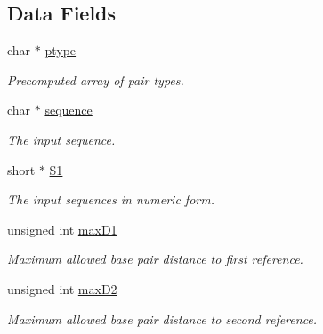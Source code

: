 \subsection*{Data Fields}
\begin{DoxyCompactItemize}
\item 
\mbox{\label{structTwoDpfold__vars_a67f37b8901b8d0a049c216d4c6241b07}} 
char $\ast$ \mbox{\hyperlink{structTwoDpfold__vars_a67f37b8901b8d0a049c216d4c6241b07}{ptype}}
\begin{DoxyCompactList}\small\item\em Precomputed array of pair types. \end{DoxyCompactList}\item 
\mbox{\label{structTwoDpfold__vars_a32c15a1e31856588259556c9020f32c6}} 
char $\ast$ \mbox{\hyperlink{structTwoDpfold__vars_a32c15a1e31856588259556c9020f32c6}{sequence}}
\begin{DoxyCompactList}\small\item\em The input sequence. \end{DoxyCompactList}\item 
\mbox{\label{structTwoDpfold__vars_a240311ae1e8e121441651d6101e187ac}} 
short $\ast$ \mbox{\hyperlink{structTwoDpfold__vars_a240311ae1e8e121441651d6101e187ac}{S1}}
\begin{DoxyCompactList}\small\item\em The input sequences in numeric form. \end{DoxyCompactList}\item 
\mbox{\label{structTwoDpfold__vars_a7292b6cbc1ee5bacf55e842f316c4bef}} 
unsigned int \mbox{\hyperlink{structTwoDpfold__vars_a7292b6cbc1ee5bacf55e842f316c4bef}{max\+D1}}
\begin{DoxyCompactList}\small\item\em Maximum allowed base pair distance to first reference. \end{DoxyCompactList}\item 
\mbox{\label{structTwoDpfold__vars_a8900622d91454d2d037242e290e42834}} 
unsigned int \mbox{\hyperlink{structTwoDpfold__vars_a8900622d91454d2d037242e290e42834}{max\+D2}}
\begin{DoxyCompactList}\small\item\em Maximum allowed base pair distance to second reference. \end{DoxyCompactList}\item 

\end{DoxyCompactItemize}
